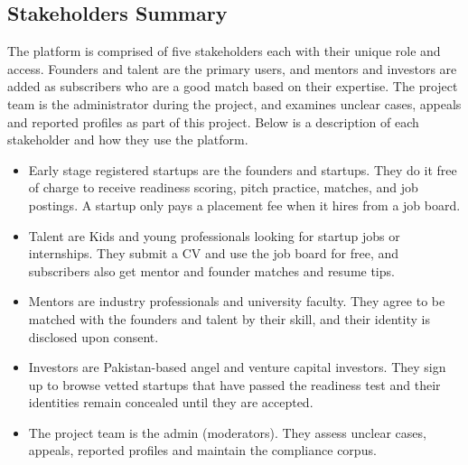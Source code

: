 \documentclass{FastFyp}
\begin{document}
\subsection{Stakeholders Summary}
The platform is comprised of five stakeholders each with their unique role and access. Founders and talent are the primary users, and mentors and investors are added as subscribers who are a good match based on their expertise. The project team is the administrator during the project, and examines unclear cases, appeals and reported profiles as part of this project. Below is a description of each stakeholder and how they use the platform.
\begin{itemize}
    \item  Early stage registered startups are the founders and startups. They do it free of charge to receive readiness scoring, pitch practice, matches, and job postings. A startup only pays a placement fee when it hires from a job board.
    \item  Talent are Kids and young professionals looking for startup jobs or internships. They submit a CV and use the job board for free, and subscribers also get mentor and founder matches and resume tips.
    \item  Mentors are industry professionals and university faculty. They agree to be matched with the founders and talent by their skill, and their identity is disclosed upon consent.
      \item Investors are Pakistan-based angel and venture capital investors. They sign up to browse vetted startups that have passed the readiness test and their identities remain concealed until they are accepted.
    \item The project team is the admin (moderators). They assess unclear cases, appeals, reported profiles and maintain the compliance corpus.
\end{itemize}
\end{document}
